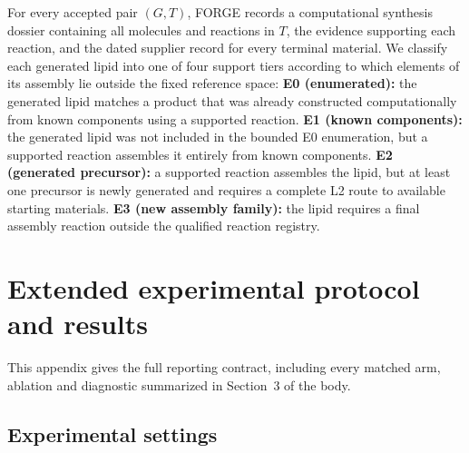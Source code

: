 \documentclass{article}
\begin{document}
For every accepted pair $(G,T)$, FORGE records a computational synthesis dossier containing all
molecules and reactions in $T$, the evidence supporting each reaction, and the dated supplier record
for every terminal material.
We classify each generated lipid into one of four support tiers according to which elements of its
assembly lie outside the fixed reference space:
\textbf{E0 (enumerated):} the generated lipid matches a product that was already constructed
computationally from known components using a supported reaction.
\textbf{E1 (known components):} the generated lipid was not included in the bounded E0 enumeration,
but a supported reaction assembles it entirely from known components.
\textbf{E2 (generated precursor):} a supported reaction assembles the lipid, but at least one
precursor is newly generated and requires a complete L2 route to available starting materials.
\textbf{E3 (new assembly family):} the lipid requires a final assembly reaction outside the
qualified reaction registry.

\clearpage

\section{Extended experimental protocol and results}
\label{app:results}

This appendix gives the full reporting contract, including every matched arm, ablation and diagnostic summarized in Section~3 of the body.

\subsection{Experimental settings}
\end{document}
